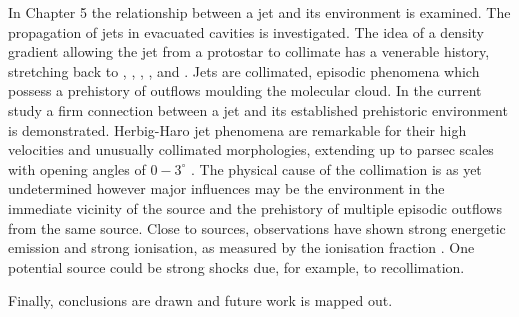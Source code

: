 In Chapter 5 the relationship between a jet and its environment is examined. The propagation of jets in evacuated cavities is investigated. 
The idea of a density gradient allowing the jet from a protostar to collimate has a venerable history, stretching back to 
\citet{1974MNRAS.169..395B},
\citet{1982ApJ...261..115K},
\citet{1982PASJ...34..483F},
\citet{1984Ap&SS..98..315S},
\citet{1984ApJ...277L..35F}
and
\citet{1986PASJ...38..199O}.
Jets are collimated, episodic phenomena which possess a prehistory of outflows moulding the molecular cloud. In the current study a firm connection between a jet and its established prehistoric environment is demonstrated. Herbig-Haro jet phenomena are remarkable for
their high velocities and unusually collimated morphologies, extending
up to parsec scales with opening angles of $0-3^{\circ}$
\citep{2000prpl.conf..815E}. The physical cause of the collimation is
as yet undetermined however major influences may be the environment in
the immediate vicinity of the source and the prehistory of multiple
episodic outflows from the same source. Close to sources, observations
have shown strong energetic emission and strong ionisation, as measured
by the ionisation fraction \citep{1999A&A...342..717B}. One potential
source could be strong shocks due, for example, to recollimation.


Finally, conclusions are drawn and future work is mapped out.
